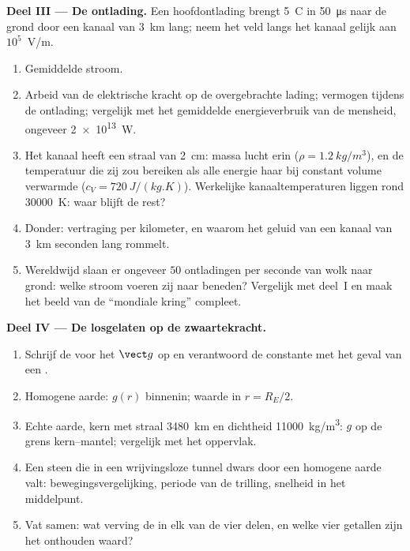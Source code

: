 \begin{problem}
\medskip
\noindent\textbf{Deel III --- De ontlading.}
Een hoofdontlading brengt \qty{5}{C} in \qty{50}{\micro s} naar de grond
door een kanaal van \qty{3}{km} lang; neem het veld langs het kanaal
gelijk aan $10^5$~V/m.
\begin{enumerate}[resume]
  \item Gemiddelde stroom.
  \item Arbeid van de elektrische kracht op de overgebrachte lading; vermogen
        tijdens de ontlading; vergelijk met het gemiddelde energieverbruik
        van de mensheid, ongeveer \qty{2e13}{W}.
  \item Het kanaal heeft een straal van \qty{2}{cm}: massa lucht erin
        ($\rho = \qty{1.2}{kg/m^3}$), en de temperatuur die zij zou bereiken als
        alle energie haar bij constant volume verwarmde ($c_V =
        \qty{720}{J/(kg.K)}$). Werkelijke kanaaltemperaturen liggen rond
        \qty{30000}{K}: waar blijft de rest?
  \item Donder: vertraging per kilometer, en waarom het geluid van een
        kanaal van \qty{3}{km} seconden lang rommelt.
  \item Wereldwijd slaan er ongeveer $50$ ontladingen per seconde van wolk naar grond:
        welke stroom voeren zij naar beneden? Vergelijk met deel~I en maak het
        beeld van de ``mondiale kring'' compleet.
\end{enumerate}

\medskip
\noindent\textbf{Deel IV --- De  losgelaten op de zwaartekracht.}
\begin{enumerate}[resume]
  \item Schrijf de  voor het  $\vect g$ op en
        verantwoord de constante met het geval van een .
  \item Homogene aarde: $g(r)$ binnenin; waarde in $r = R_E/2$.
  \item Echte aarde, kern met straal \qty{3480}{km} en dichtheid
        \qty{11000}{kg/m^3}: $g$ op de grens kern--mantel; vergelijk met
        het oppervlak.
  \item Een steen die in een wrijvingsloze tunnel dwars door een homogene
        aarde valt: bewegingsvergelijking, periode van de trilling, snelheid in
        het middelpunt.
  \item Vat samen: wat verving de  in elk van de vier delen,
        en welke vier getallen zijn het onthouden waard?
\end{enumerate}
\end{problem}
